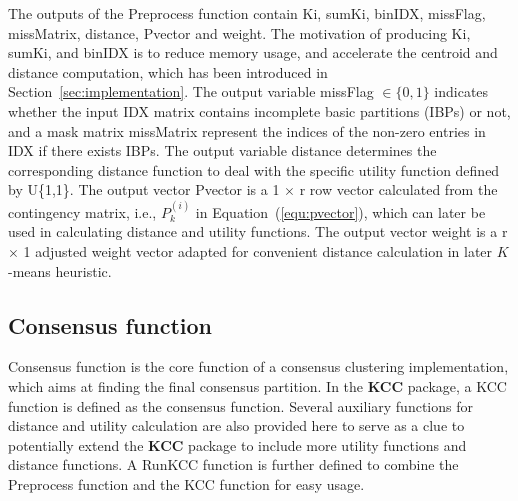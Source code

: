 \documentclass[acmsmall,screen,review]{acmart}
\begin{document}

The outputs of the \textsf{Preprocess} function contain \textsf{Ki}, \textsf{sumKi}, \textsf{binIDX}, \textsf{missFlag}, \textsf{missMatrix}, \textsf{distance}, \textsf{Pvector} and \textsf{weight}. The motivation of producing \textsf{Ki}, \textsf{sumKi}, and \textsf{binIDX} is to reduce memory usage, and accelerate the centroid and distance computation, which has been introduced in Section~\ref{sec:implementation}. The output variable \textsf{missFlag} $\in \{0, 1\}$ indicates whether the input \textsf{IDX} matrix contains incomplete basic partitions (IBPs) or not, and a mask matrix \textsf{missMatrix} represent the indices of the non-zero entries in \textsf{IDX} if there exists IBPs. The output variable \textsf{distance} determines the corresponding distance function to deal with the specific utility function defined by \textsf{U\{1,1\}}. The output vector \textsf{Pvector} is a \textsf{1} $\times$ \textsf{r} row vector calculated from the contingency matrix, i.e., $P^{(i)}_k$ in Equation~(\ref{equ:pvector}), which can later be used in calculating distance  and utility functions. The output vector \textsf{weight} is a \textsf{r} $\times$ \textsf{1} adjusted weight vector adapted for convenient distance calculation in later $K$-means heuristic. 

\subsection{Consensus function}
Consensus function is the core function of a consensus clustering implementation, which aims at finding the final consensus partition. In the \textbf{KCC} package, a \textsf{KCC} function is defined as the consensus function. Several auxiliary functions for distance and utility calculation are also provided here to serve as a clue to potentially extend the \textbf{KCC} package to include more utility functions and distance functions. A \textsf{RunKCC} function is further defined to combine the \textsf{Preprocess} function and the \textsf{KCC} function for easy usage.
\end{document}
